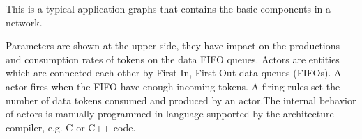 	This is a typical application graphs that contains the basic components in a network.
	
	Parameters are shown at the upper side, they have impact on the productions and consumption rates of tokens on the data FIFO queues.	
	Actors are entities which are connected each other by First In, First Out data queues (FIFOs). A actor fires when the FIFO have enough incoming tokens. A firing rules set the number of data tokens consumed and produced by an actor.The internal behavior of actors is manually programmed in language supported by the architecture compiler, e.g. C or C++ code.
	
	
	
	
	
	  
  